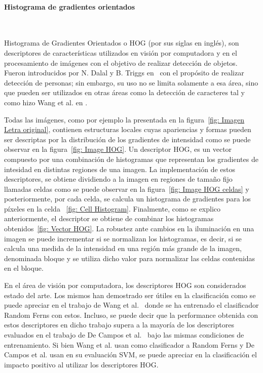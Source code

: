 \paragraph{Histograma de gradientes orientados} ~\\
\label{subsection:hog}

	Histograma de Gradientes Orientados o HOG (por sus siglas en inglés), son descriptores de características utilizados en visión por computadora y en el procesamiento de imágenes con el objetivo de realizar detección de objetos. Fueron introducidos por N. Dalal y B. Triggs en~\cite{DT05} con el propósito de realizar detección de personas; sin embargo, su uso no se limita solamente a esa área, sino que pueden ser utilizados en otras áreas como la detección de caracteres tal y como hizo Wang et al. en \cite{wang}.
	
	Todas las imágenes, como por ejemplo la presentada en la figura~\ref{fig: Imagen Letra original}, contienen estructuras locales cuyas apariencias y formas pueden ser descriptas por la distribución de los gradientes de intensidad como se puede observar en la figura~\ref{fig: Image HOG}.	Un descriptor HOG, es un vector compuesto por una combinación de histogramas que representan los gradientes de intesidad en distintas regiones de una imagen. La implementación de estos descriptores, se obtiene dividiendo a la imagen en regiones de tamaño fijo llamadas celdas como se puede observar en la figura~\ref{fig: Image HOG celdas} y posteriormente, por cada celda, se calcula un histograma de gradientes para los píxeles en la celda ~\ref{fig: Cell Histogram}. Finalmente, como se explico anteriormente, el descriptor se obtiene de combinar los histogramas obtenidos~\ref{fig: Vector HOG}. La robustez ante cambios en la iluminación en una imagen se puede incrementar si se normalizan los histogramas, es decir, si se calcula una medida de la intensidad en una región más grande de la imagen, denominada bloque y se utiliza dicho valor para normalizar las celdas contenidas en el bloque.
	
	
	En el área de visión por computadora, los descriptores HOG son considerados estado del arte. Los mismos han demostrado ser útiles en la clasificación como se puede apreciar en el trabajo de Wang et al.~\cite{wang} donde se ha entrenado el clasificador Random Ferns con estos. Incluso, se puede decir que la performance obtenida con estos descriptores en dicho trabajo supera a la mayoría de los descriptores evaluados en el trabajo de De Campos et al.~\cite{dCBV09} bajo las mismas condiciones de entrenamiento. Si bien Wang et al. usan como clasificador a Random Ferns y De Campos et al. usan en su evaluación SVM, se puede apreciar en la clasificación el impacto positivo al utilizar los descriptores HOG.
	
